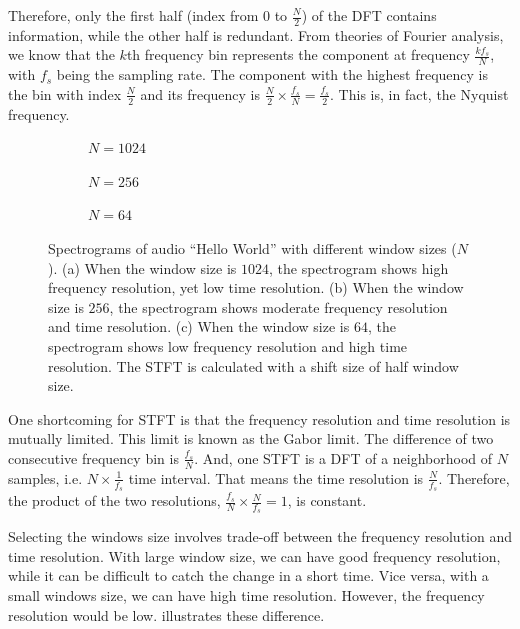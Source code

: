 \documentclass[12pt,final,twoside]{report}
\theoremstyle{plain}
\theoremstyle{definition}
\theoremstyle{remark}
\newcommand{\includetexfig}[1]{}
\begin{document}
Therefore, only the first half (index from $0$ to $\frac{N}{2}$) of the DFT contains information, while the other half is redundant. From theories of Fourier analysis, we know that the $k$th frequency bin represents the component at frequency $\frac{kf_s}{N}$, with $f_s$ being the sampling rate. The component with the highest frequency is the bin with index $\frac{N}{2}$ and its frequency is $\frac{N}{2} \times \frac{f_s}{N} = \frac{f_s}{2}$. This is, in fact, the Nyquist frequency.

\begin{figure}[t]
  \centering
  \begin{subfigure}[b]{.8\textwidth}
    \includetexfig{spec1024}
    \caption{$N=1024$}
    \label{fig:spec1024}
  \end{subfigure}

  \begin{subfigure}[b]{.8\textwidth}
    \includetexfig{spec256}
    \caption{$N=256$}
    \label{fig:spec256}
  \end{subfigure}

  \begin{subfigure}[b]{.8\textwidth}
    \includetexfig{spec64}
    \caption{$N=64$}
    \label{fig:spec64}
  \end{subfigure}

  \caption[Spectrograms with different window sizes]{Spectrograms of audio ``Hello World'' with different window sizes ($N$). (a) When the window size is $1024$, the spectrogram shows high frequency resolution, yet low time resolution.
(b) When the window size is $256$, the spectrogram shows moderate frequency resolution and time resolution.
(c) When the window size is $64$, the spectrogram shows low frequency resolution and high time resolution.
  The STFT is calculated with a shift size of half window size. }
  \label{fig:spec}
\end{figure}

One shortcoming for STFT is that the frequency resolution and time resolution is mutually limited. This limit is known as the Gabor limit. The difference of two consecutive frequency bin is $\frac{f_s}{N}$. And, one STFT is a DFT of a neighborhood of $N$ samples, i.e. $N \times \frac{1}{f_s}$ time interval. That means the time resolution is $\frac{N}{f_s}$. Therefore, the product of the two resolutions, $\frac{f_s}{N} \times \frac{N}{f_s} = 1$, is constant. 

Selecting the windows size involves trade-off between the frequency resolution and time resolution. With large window size, we can have good frequency resolution, while it can be difficult to catch the change in a short time. Vice versa, with a small windows size, we can have high time resolution. However, the frequency resolution would be low.  illustrates these difference.
\end{document}
